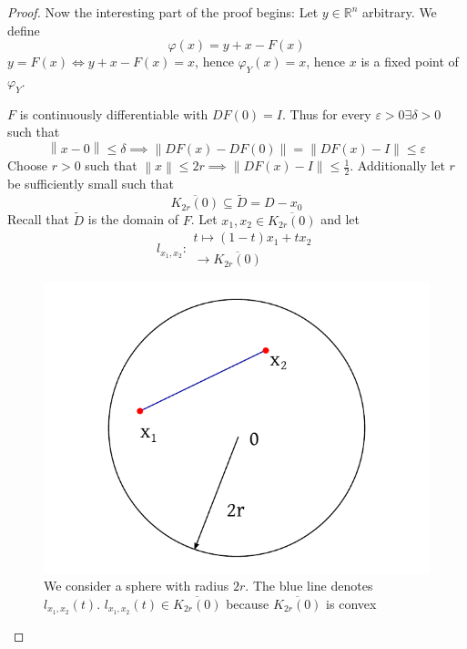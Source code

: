 \documentclass{article}
\newcommand{\norm}[1]{\left\|#1\right\|}
\begin{document}
\begin{proof}
  Now the interesting part of the proof begins:
  Let $y \in \mathbb R^n$ arbitrary. We define
  \[ \varphi(x) = y + x - F(x) \]
  $y = F(x) \iff y + x - F(x) = x$, hence $\varphi_Y(x) = x$, hence $x$ is a fixed point of $\varphi_Y$.
  
  $F$ is continuously differentiable with $DF(0) = I$. Thus for every $\varepsilon > 0 \exists \delta > 0$ such that
  \[ \norm{x - 0} \leq \delta \implies \norm{DF(x) - DF(0)} = \norm{DF(x) - I} \leq \varepsilon \]
  Choose $r > 0$ such that $\norm{x} \leq 2r \implies \norm{DF(x) - I} \leq \frac12$.
  Additionally let $r$ be sufficiently small such that
  \[ \overline{K_{2r}(0)} \subseteq \tilde D = D - x_0 \]
  Recall that $\tilde D$ is the domain of $F$.
  Let $x_1, x_2 \in \overline{K_{2r}(0)}$ and let
  \[ l_{x_1,x_2}: \substack{t \mapsto (1 - t) x_1 + t x_2 \\ [0, 1] \to \overline{K_{2r}(0)}} \]
  
  \begin{figure}[t]
    \begin{center}
      \includegraphics{img/35_x1x2.pdf}
      \caption{We consider a sphere with radius $2r$. The blue line denotes $l_{x_1, x_2}(t)$. $l_{x_1, x_2}(t) \in \overline{K_{2r}(0)}$ because $\overline{K_{2r}(0)}$ is convex}
      \label{img:x1x2}
    \end{center}
  \end{figure}
  

\end{proof}
\end{document}
